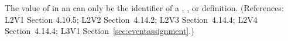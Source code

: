 The value of  in an \EventAssignment can only be the
identifier of a \Compartment, \Species, \Parameter or \SpeciesReference
definition.  (References: L2V1 Section 4.10.5; L2V2 Section~4.14.2;
L2V3 Section~4.14.4; L2V4 Section~4.14.4; L3V1 Section~\ref{sec:eventassignment}.)
